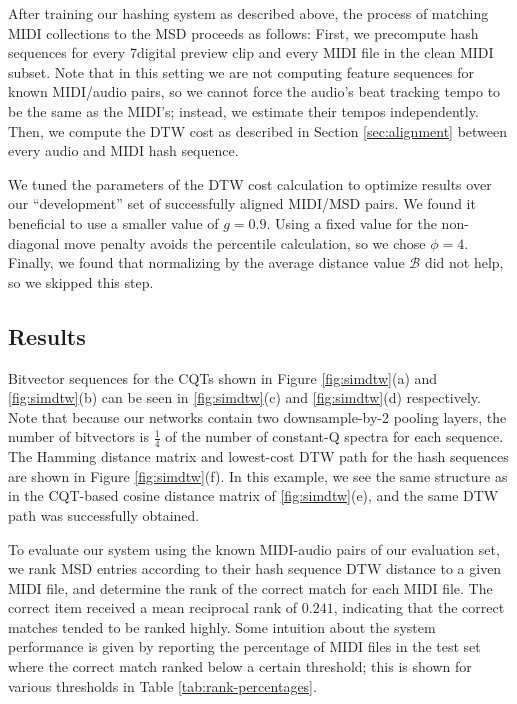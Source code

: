 \documentclass{article}
\begin{document}
After training our hashing system as described above, the process of matching MIDI collections to the MSD proceeds as follows:
First, we precompute hash sequences for every 7digital preview clip and every MIDI file in the clean MIDI subset.
Note that in this setting we are not computing feature sequences for known MIDI/audio pairs, so we cannot force the audio's beat tracking tempo to be the same as the MIDI's; instead, we estimate their tempos independently.
Then, we compute the DTW cost as described in Section \ref{sec:alignment} between every audio and MIDI hash sequence.

We tuned the parameters of the DTW cost calculation to optimize results over our ``development'' set of successfully aligned MIDI/MSD pairs.
We found it beneficial to use a smaller value of $g = 0.9$.
Using a fixed value for the non-diagonal move penalty avoids the percentile calculation, so we chose $\phi = 4$.
Finally, we found that normalizing by the average distance value $\mathcal{B}$ did not help, so we skipped this step.

\subsection{Results}

Bitvector sequences for the CQTs shown in Figure \ref{fig:simdtw}(a) and \ref{fig:simdtw}(b) can be seen in \ref{fig:simdtw}(c) and \ref{fig:simdtw}(d) respectively.
Note that because our networks contain two downsample-by-2 pooling layers, the number of bitvectors is $\frac{1}{4}$ of the number of constant-Q spectra for each sequence.
The Hamming distance matrix and lowest-cost DTW path for the hash sequences are shown in Figure \ref{fig:simdtw}(f).
In this example, we see the same structure as in the CQT-based cosine distance matrix of  \ref{fig:simdtw}(e), and the same DTW path was successfully obtained.

To evaluate our system using the known MIDI-audio pairs of our evaluation set, we rank MSD entries according to their hash sequence DTW distance to a given MIDI file, and determine the rank of the correct match for each MIDI file.
The correct item received a mean reciprocal rank of \textbf{$0.241$}, indicating that the correct matches tended to be ranked highly.  
Some intuition about the system performance is given by reporting the percentage of MIDI files in the test set where the correct match ranked below a certain threshold; this is shown for various thresholds in Table \ref{tab:rank-percentages}.
\end{document}
